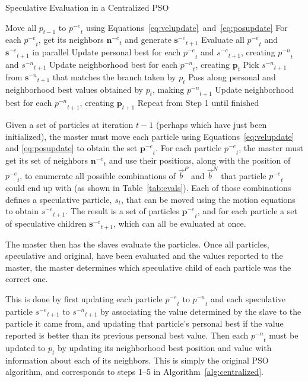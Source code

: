 \documentclass[journal,letterpaper]{IEEEtran}
\newcommand{\alg}[1]{Algorithm~\ref{alg:#1}}
\providecommand{\pers}{\ensuremath{P}}
\providecommand{\neigh}{\ensuremath{N}}
\providecommand{\nbest}{\ensuremath{\Vec{b}^\neigh}}
\providecommand{\pbest}{\ensuremath{\Vec{b}^\pers}}
\providecommand{\noeval}[1]{\ensuremath{#1^{-e}}}
\providecommand{\nonbest}[1]{\ensuremath{#1^{-n}}}
\providecommand{\p}{\ensuremath{p}}
\providecommand{\pset}{\ensuremath{\mathbf{p}}}
\providecommand{\s}{\ensuremath{s}}
\providecommand{\sset}{\ensuremath{\mathbf{s}}}
\providecommand{\nset}{\ensuremath{\mathbf{n}}}
\begin{document}
\begin{algorithm}
  \caption{Speculative Evaluation in a Centralized PSO}
  \label{alg:centralized}
  \begin{algorithmic}[1]
	\STATE Move all $\p_{t-1}$ to $\noeval{\p}_t$ using
	  Equations~\eqref{eq:velupdate}~and~\eqref{eq:posupdate}
	\STATE For each $\noeval{\p}_t$, get its neighbors $\noeval{\nset}_t$ and
	  generate $\noeval{\sset}_{t+1}$
	\STATE Evaluate all $\noeval{\p}_t$ and $\noeval{\sset}_{t+1}$ in parallel
	\STATE Update personal best for each $\noeval{\p}_t$ and
	  $\noeval{\s}_{t+1}$, creating $\nonbest{\p}_t$ and $\nonbest{\s}_{t+1}$
	\STATE Update neighborhood best for each $\nonbest{\p}_t$, creating
	  $\pset_t$
	\FORALL{$\p_t$}
	\STATE Pick $\nonbest{\s}_{t+1}$ from $\nonbest{\sset}_{t+1}$ that matches
	  the branch taken by $\p_t$
	\STATE Pass along personal and neighborhood best values obtained by $\p_t$,
	  making $\nonbest{\p}_{t+1}$
	\ENDFOR
	\STATE Update neighborhood best for each $\nonbest{\p}_{t+1}$, creating
	  $\pset_{t+1}$
	\STATE Repeat from Step 1 until finished
  \end{algorithmic}
\end{algorithm}

Given a set of particles at iteration $t-1$ (perhaps which have just been
initialized), the master must move each particle using
Equations~\eqref{eq:velupdate} and \eqref{eq:posupdate} to obtain the set
$\noeval{\pset}_t$.  For each particle $\noeval{\p}_t$, the master must get its
set of neighbors $\noeval{\nset}_t$ and use their positions, along with the
position of $\noeval{\p}_t$, to enumerate all possible combinations of $\pbest$
and $\nbest$ that particle $\noeval{\p}_t$ could end up with (as shown in
Table~\ref{tab:evals}).  Each of those combinations defines a speculative
particle, $\s_t$, that can be moved using the motion equations to obtain
$\noeval{\s}_{t+1}$.  The result is a set of particles $\noeval{\pset}_t$, and
for each particle a set of speculative children $\noeval{\sset}_{t+1}$, which
can all be evaluated at once.

The master then has the slaves evaluate the particles.  Once all particles,
speculative and original, have been evaluated and the values reported to the
master, the master determines which speculative child of each particle was the
correct one.

This is done by first updating each particle $\noeval{\p}_t$ to
$\nonbest{\p}_t$ and each speculative particle $\noeval{\s}_{t+1}$ to
$\nonbest{\s}_{t+1}$ by associating the value determined by the slave to the
particle it came from, and updating that particle's personal best if the value
reported is better than its previous personal best value.  Then each
$\nonbest{\p}_t$ must be updated to $\p_t$ by updating its neighborhood best
position and value with information about each of its neighbors.  This is
simply the original PSO algorithm, and corresponds to steps 1--5 in
\alg{centralized}.
\end{document}
